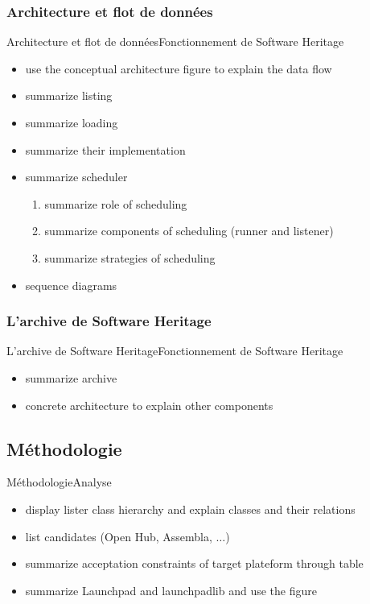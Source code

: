 \documentclass{beamer}
\begin{document}
    \subsubsection{Architecture et flot de données}
      \begin{frame}{Architecture et flot de données}{Fonctionnement de Software Heritage}
        \begin{itemize}
          \item use the conceptual architecture figure to explain the data flow
          \item summarize listing
          \item summarize loading
          \item summarize their implementation
          \item summarize scheduler
            \begin{enumerate}
              \item summarize role of scheduling
              \item summarize components of scheduling (runner and listener)
              \item summarize strategies of scheduling
            \end{enumerate}
          \item sequence diagrams
        \end{itemize}
      \end{frame}

    \subsubsection{L'archive de Software Heritage}
      \begin{frame}{L'archive de Software Heritage}{Fonctionnement de Software Heritage}
        \begin{itemize}
          \item summarize archive
          \item concrete architecture to explain other components
        \end{itemize}
      \end{frame}

  \subsection{Méthodologie}
    \begin{frame}{Méthodologie}{Analyse}
      \begin{itemize}
        \item display lister class hierarchy and explain classes and their relations
        \item list candidates (Open Hub, Assembla, $\dots$)
        \item summarize acceptation constraints of target plateform through table
        \item summarize Launchpad and launchpadlib and use the figure
      \end{itemize}
    \end{frame}
\end{document}
